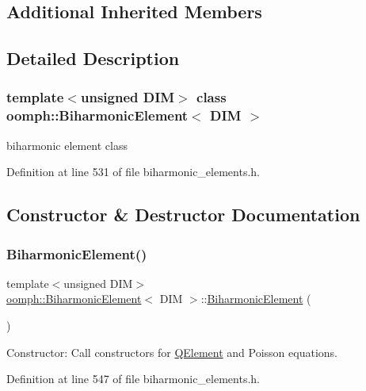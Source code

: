 \subsection*{Additional Inherited Members}


\subsection{Detailed Description}
\subsubsection*{template$<$unsigned D\+IM$>$\newline
class oomph\+::\+Biharmonic\+Element$<$ D\+I\+M $>$}

biharmonic element class 

Definition at line 531 of file biharmonic\+\_\+elements.\+h.



\subsection{Constructor \& Destructor Documentation}
\mbox{\label{classoomph_1_1BiharmonicElement_ae7ea696a05373fc4105a99bf4a8e49d7}} 
\subsubsection{\texorpdfstring{Biharmonic\+Element()}{BiharmonicElement()}}
{\footnotesize\ttfamily template$<$unsigned D\+IM$>$ \\
\hyperlink{classoomph_1_1BiharmonicElement}{oomph\+::\+Biharmonic\+Element}$<$ D\+IM $>$\+::\hyperlink{classoomph_1_1BiharmonicElement}{Biharmonic\+Element} (\begin{DoxyParamCaption}{ }\end{DoxyParamCaption})\hspace{0.3cm}{\ttfamily [inline]}}



Constructor\+: Call constructors for \hyperlink{classoomph_1_1QElement}{Q\+Element} and Poisson equations. 



Definition at line 547 of file biharmonic\+\_\+elements.\+h.

